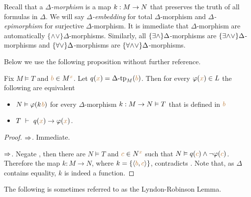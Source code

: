 Recall that a \emph{$\Delta$-morphism\/} is a map $k:M\rightarrow N$ that preserves the truth of all formulas in $\Delta$. 
We will say \emph{$\Delta$-embedding\/} for total $\Delta$-morphism and \emph{$\Delta$-epimorphism\/} for surjective $\Delta$-morphism.
It is immediate that $\Delta$-morphism are automatically $\{\mathord\wedge\mathord\vee\}\Delta$-morphisms.
Similarly, all $\{\exists\wedge\}\Delta$-morphisms are $\{\exists\mathord\wedge\mathord\vee\}\Delta$-morphisms and $\{\forall\vee\}\Delta$-morphisms are $\{\forall\mathord\wedge\mathord\vee\}\Delta$-morphisms.

Below we use the following proposition without further reference.
\def\.{\kern0.2ex}
\begin{proposition}\label{prop_pokj}
Fix $M\models T$ and ${\color{brown} b}\in M^{\color{brown} x}$. Let $q({\color{brown} x})=\Delta\mbox{\rm -tp}_M({\color{brown} b})$. Then for every $\varphi({\color{brown} x})\in L$ the following are equivalent
\begin{itemize}
\item[1.] $N\models\phi(k\.{\mr b})$ for every $\Delta$-morphism $k:M\rightarrow N\vDash T$ that is defined in ${\color{brown} b}$
\item[2.] $T\ \vdash\  q({\color{brown} x})\rightarrow\varphi({\color{brown} x})$.
\end{itemize}
\end{proposition}
\begin{proof}%
%
$\Rightarrow$. Immediate.  

$\Rightarrow$. Negate , then there are $N\models T$ and ${\color{brown} c}\in N^{\color{brown} x}$ such that $N\vDash q({\color{brown} c})\wedge\neg\varphi({\color{brown} c})$. Therefore the map $k:M\to N$, where $k=\{\langle{\color{brown}b},{\color{brown} c}\rangle\}$, contradicts .
Note that, as $\Delta$ contains equality, $k$ is indeed a function.
\end{proof}

The following is sometimes referred to as the Lyndon-Robinson Lemma.

